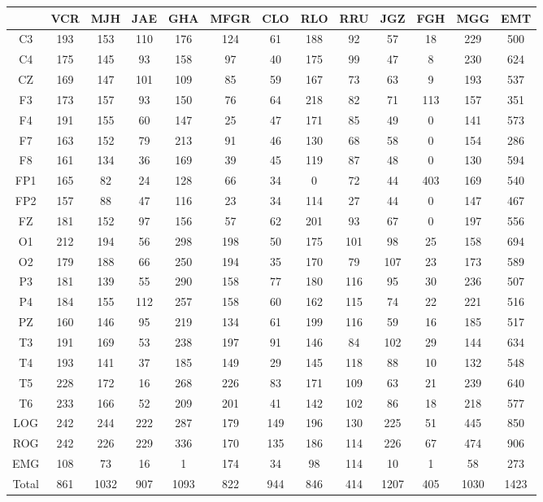 \documentclass[12pt,a4paper]{mitthesis}
\begin{document}
\begin{SidewaysFigure}
\centering
\begin{tabular}{c|ccccc|cccc|ccc}
& VCR & MJH & JAE & GHA & MFGR
& CLO & RLO & RRU & JGZ
& FGH & MGG & EMT \\
\hline
C3&193&153&110&176&124&61&188&92&57&18&229&500 \\
C4&175&145&93&158&97&40&175&99&47&8&230&624 \\
CZ&169&147&101&109&85&59&167&73&63&9&193&537 \\
F3&173&157&93&150&76&64&218&82&71&113&157&351 \\
F4&191&155&60&147&25&47&171&85&49&0&141&573 \\
F7&163&152&79&213&91&46&130&68&58&0&154&286 \\
F8&161&134&36&169&39&45&119&87&48&0&130&594 \\
FP1&165&82&24&128&66&34&0&72&44&403&169&540 \\
FP2&157&88&47&116&23&34&114&27&44&0&147&467 \\
FZ&181&152&97&156&57&62&201&93&67&0&197&556 \\
O1&212&194&56&298&198&50&175&101&98&25&158&694 \\
O2&179&188&66&250&194&35&170&79&107&23&173&589 \\
P3&181&139&55&290&158&77&180&116&95&30&236&507 \\
P4&184&155&112&257&158&60&162&115&74&22&221&516 \\
PZ&160&146&95&219&134&61&199&116&59&16&185&517 \\
T3&191&169&53&238&197&91&146&84&102&29&144&634 \\
T4&193&141&37&185&149&29&145&118&88&10&132&548 \\
T5&228&172&16&268&226&83&171&109&63&21&239&640 \\
T6&233&166&52&209&201&41&142&102&86&18&218&577 \\
LOG&242&244&222&287&179&149&196&130&225&51&445&850 \\
ROG&242&226&229&336&170&135&186&114&226&67&474&906 \\
EMG&108&73&16&1&174&34&98&114&10&1&58&273 \\
\hline
Total&861&1032&907&1093&822&944&846&414&1207&405&1030&1423
\end{tabular}
\caption{Total de \'epocas PE registradas
(todas las fases) para cada
canal. 
}
\label{total_gpos_total}
\end{SidewaysFigure}
\end{document}
